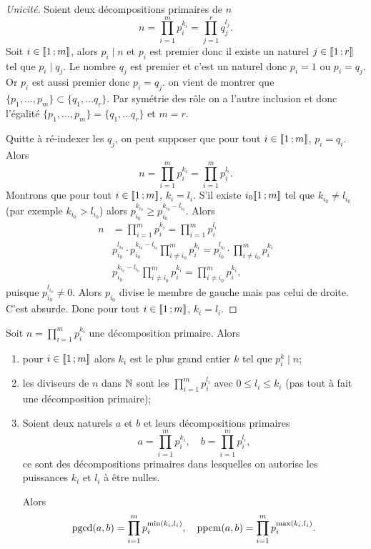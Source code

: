 \begin{proof}[Unicité]
  Soient deux décompositions primaires de $n$
  \begin{equation}
    n=\prod_{i=1}^m p_i^{k_i} = \prod_{j=1}^r q_j^{l_j}.
  \end{equation}
  Soit $i \in \mathopen{\llbracket}1\mathclose{}\mathpunct{};m\mathclose{\rrbracket}$, alors $p_i \mid n$ et $p_i$ est premier donc il existe un naturel $j \in \mathopen{\llbracket}1\mathclose{}\mathpunct{};r\mathclose{\rrbracket}$ tel que $p_i \mid q_j$. Le nombre $q_j$ est premier et c'est un naturel donc $p_i=1$ ou $p_i=q_j$. Or $p_i$ est aussi premier donc $p_i=q_j$. on vient de montrer que $\{p_1, \ldots, p_m\} \subset \{q_1, \ldots q_r\}$. Par symétrie des rôle on a l'autre inclusion et donc l'égalité $\{p_1, \ldots, p_m\} = \{q_1, \ldots q_r\}$ et $m=r$.

  Quitte à ré-indexer les $q_j$, on peut supposer que pour tout $i \in \mathopen{\llbracket}1\mathclose{}\mathpunct{};m\mathclose{\rrbracket}$, $p_i=q_i$. Alors
  \begin{equation}
    n=\prod_{i=1}^m p_i^{k_i} = \prod_{i=1}^m p_i^{l_i}.
  \end{equation}
  Montrons que pour tout $i \in \mathopen{\llbracket}1\mathclose{}\mathpunct{};m\mathclose{\rrbracket}$, $k_i=l_i$. S'il existe $i_0 \mathopen{\llbracket}1\mathclose{}\mathpunct{};m\mathclose{\rrbracket}$ tel que $k_{i_0} \neq l_{i_0}$ (par exemple $k_{i_0} > l_{i_0}$) alors $p_{i_0}^{k_{i_0}} \geqslant p_{i_0}^{k_{i_0}-l_{i_0}}$. Alors
\begin{align}
    n&=\prod_{i=1}^m p_i^{k_i} = \prod_{i=1}^m p_i^{l_i} \\
    &p_{i_0}^{l_{i_0}} \cdot p_{i_0}^{k_{i_0}-l_{i_0}} \prod_{i \neq i_0}^m p_i^{k_i} = p_{i_0}^{l_{i_0}} \cdot \prod_{i \neq i_0}^m p_i^{k_i}\\
    &p_{i_0}^{k_{i_0}-l_{i_0}} \prod_{i \neq i_0}^m p_i^{k_i} =\prod_{i \neq i_0}^m p_i^{k_i},
  \end{align}
  puisque $p_{i_0}^{l_{i_0}} \neq 0$. Alors $p_{i_0}$ divise le membre de gauche mais pas celui de droite. C'est absurde. Donc pour tout $i \in \mathopen{\llbracket}1\mathclose{}\mathpunct{};m\mathclose{\rrbracket}$,  $k_i=l_i$.
\end{proof}
\begin{corth}
  Soit $n=\prod_{i=1}^m p_i^{k_i}$ une décomposition primaire. Alors
  \begin{enumerate}
  \item pour $i \in \mathopen{\llbracket}1\mathclose{}\mathpunct{};m\mathclose{\rrbracket}$ alors $k_i$ est le plus grand entier $k$ tel que $p_i^k \mid n$;
  \item les diviseurs de $n$ dans $\mathbb{N}$ sont les $\prod_{i=1}^m p_i^{l_i}$ avec $0 \leqslant l_i \leqslant k_i$ (pas tout à fait une décomposition primaire);
  \item Soient deux naturels $a$ et $b$ et leurs décompositions primaires
    \begin{equation}
      a=\prod_{i=1}^m p_i^{k_i}, \quad b=\prod_{i=1}^m p_i^{l_i},
    \end{equation}
    ce sont des décompositions primaires dans lesquelles on autorise les puissances $k_i$ et $l_i$ à être nulles. 

    Alors
    \begin{equation}
      \operatorname{pgcd}(a,b) = \prod_{i=1}^m p_i^{\min(k_i,l_i)}, \quad \operatorname{ppcm}(a,b) = \prod_{i=1}^m p_i^{\max(k_i,l_i)}.
    \end{equation}
  \end{enumerate}
\end{corth}
